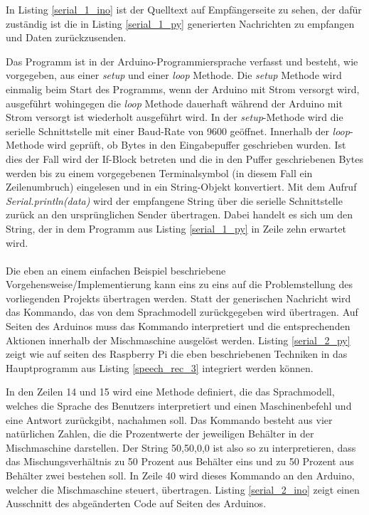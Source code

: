 In Listing \ref{serial_1_ino} ist der Quelltext auf Empfängerseite zu sehen, der dafür zuständig ist die in Listing \ref{serial_1_py} generierten Nachrichten zu empfangen und Daten zurückzusenden.

Das Programm ist in der Arduino-Programmiersprache verfasst und besteht, wie vorgegeben, aus einer \textit{setup} und einer \textit{loop} Methode. Die \textit{setup} Methode wird einmalig beim Start des Programms, wenn der Arduino mit Strom versorgt wird, ausgeführt wohingegen die \textit{loop} Methode dauerhaft während der Arduino mit Strom versorgt ist wiederholt ausgeführt wird. In der \textit{setup}-Methode wird die serielle Schnittstelle mit einer Baud-Rate von 9600 geöffnet. Innerhalb der \textit{loop}-Methode wird geprüft, ob Bytes in den Eingabepuffer geschrieben wurden. Ist dies der Fall wird der If-Block betreten und die in den Puffer geschriebenen Bytes werden bis zu einem vorgegebenen Terminalsymbol (in diesem Fall ein Zeilenumbruch) eingelesen und in ein String-Objekt konvertiert. Mit dem Aufruf \textit{Serial.println(data)} wird der empfangene String über die serielle Schnittstelle zurück an den ursprünglichen Sender übertragen. Dabei handelt es sich um den String, der in dem Programm aus Listing \ref{serial_1_py} in Zeile zehn erwartet wird.\\\\
Die eben an einem einfachen Beispiel beschriebene Vorgehensweise/Implementierung kann eins zu eins auf die Problemstellung des vorliegenden Projekts übertragen werden. Statt der generischen Nachricht wird das Kommando, das von dem Sprachmodell zurückgegeben wird übertragen. Auf Seiten des Arduinos muss das Kommando interpretiert und die entsprechenden Aktionen innerhalb der Mischmaschine ausgelöst werden. Listing \ref{serial_2_py} zeigt wie auf seiten des Raspberry Pi die eben beschriebenen Techniken in das Hauptprogramm aus Listing \ref{speech_rec_3} integriert werden können.

In den Zeilen 14 und 15 wird eine Methode definiert, die das Sprachmodell, welches die Sprache des Benutzers interpretiert und einen Maschinenbefehl und eine Antwort zurückgibt, nachahmen soll. Das Kommando besteht aus vier natürlichen Zahlen, die die Prozentwerte der jeweiligen Behälter in der Mischmaschine darstellen. Der String \glqq{}50,50,0,0\grqq{} ist also so zu interpretieren, dass das Mischungsverhältnis zu 50 Prozent aus Behälter eins und zu 50 Prozent aus Behälter zwei bestehen soll. In Zeile 40 wird dieses Kommando an den Arduino, welcher die Mischmaschine steuert, übertragen. Listing \ref{serial_2_ino} zeigt einen Ausschnitt des abgeänderten Code auf Seiten des Arduinos.
